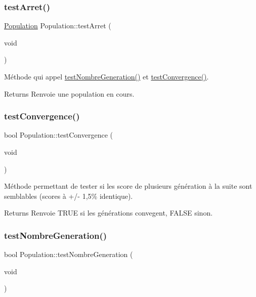 \subsubsection{\texorpdfstring{test\+Arret()}{testArret()}}
{\footnotesize\ttfamily \hyperlink{class_population}{Population} Population\+::test\+Arret (\begin{DoxyParamCaption}\item[{void}]{ }\end{DoxyParamCaption})}



Méthode qui appel \hyperlink{class_population_a9192297f35ab0c6c6078ae087b3e4aee}{test\+Nombre\+Generation()} et \hyperlink{class_population_ae3511322c007fc85a8dd9bda0693b9cf}{test\+Convergence()}. 

\begin{DoxyReturn}{Returns}
Renvoie une population en cours. 
\end{DoxyReturn}
\mbox{\label{class_population_ae3511322c007fc85a8dd9bda0693b9cf}} 
\subsubsection{\texorpdfstring{test\+Convergence()}{testConvergence()}}
{\footnotesize\ttfamily bool Population\+::test\+Convergence (\begin{DoxyParamCaption}\item[{void}]{ }\end{DoxyParamCaption})}



Méthode permettant de tester si les score de plusieurs génération à la suite sont semblables (scores à +/-\/ 1,5\% identique). 

\begin{DoxyReturn}{Returns}
Renvoie T\+R\+UE si les générations convegent, F\+A\+L\+SE sinon. 
\end{DoxyReturn}
\mbox{\label{class_population_a9192297f35ab0c6c6078ae087b3e4aee}} 
\subsubsection{\texorpdfstring{test\+Nombre\+Generation()}{testNombreGeneration()}}
{\footnotesize\ttfamily bool Population\+::test\+Nombre\+Generation (\begin{DoxyParamCaption}\item[{void}]{ }\end{DoxyParamCaption})}



